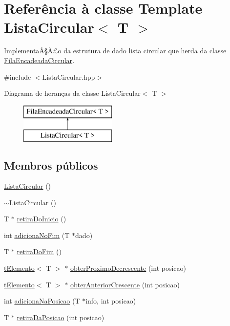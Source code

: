 \hypertarget{class_lista_circular}{\section{Referência à classe Template Lista\+Circular$<$ T $>$}
\label{class_lista_circular}
}


ImplementaÃ§Ã£o da estrutura de dado lista circular que herda da classe \hyperlink{class_fila_encadeada_circular}{Fila\+Encadeada\+Circular}.  




{\ttfamily \#include $<$Lista\+Circular.\+hpp$>$}

Diagrama de heranças da classe Lista\+Circular$<$ T $>$\begin{figure}[H]
\begin{center}
\leavevmode
\includegraphics[height=2.000000cm]{class_lista_circular}
\end{center}
\end{figure}
\subsection*{Membros públicos}
\begin{DoxyCompactItemize}
\item 
\hyperlink{class_lista_circular_a257dc7d8b78f8312ac821ba437d9ab77}{Lista\+Circular} ()
\item 
\hyperlink{class_lista_circular_a17151a2a3416edbcdb8d095e64068c05}{$\sim$\+Lista\+Circular} ()
\item 
T $\ast$ \hyperlink{class_lista_circular_ae60601f89f078c8e456e6cd27188ea6d}{retira\+Do\+Inicio} ()
\item 
int \hyperlink{class_lista_circular_affd9b0cb331519a4386dc172708a4729}{adiciona\+No\+Fim} (T $\ast$dado)
\item 
T $\ast$ \hyperlink{class_lista_circular_a5314f5fcd36f0a7bc3f140971737b66a}{retira\+Do\+Fim} ()
\item 
\hyperlink{classt_elemento}{t\+Elemento}$<$ T $>$ $\ast$ \hyperlink{class_lista_circular_abfe109e00fc3bb438a26335586c2e0cb}{obter\+Proximo\+Decrescente} (int posicao)
\item 
\hyperlink{classt_elemento}{t\+Elemento}$<$ T $>$ $\ast$ \hyperlink{class_lista_circular_a3eb9602a4d4585f2b5d8bca3dd66146d}{obter\+Anterior\+Crescente} (int posicao)
\item 
int \hyperlink{class_lista_circular_a8fdef408a651dd0e86ef251ffe58e074}{adiciona\+Na\+Posicao} (T $\ast$info, int posicao)
\item 
T $\ast$ \hyperlink{class_lista_circular_ae310f8ef47da383064c3921bdc50f1c6}{retira\+Da\+Posicao} (int posicao)
\end{DoxyCompactItemize}
